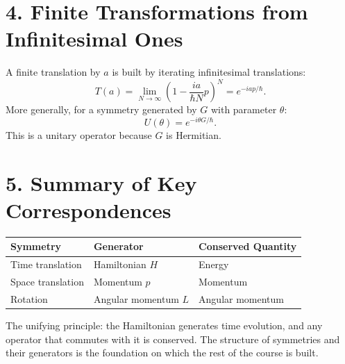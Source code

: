 \documentclass[12pt,a4paper]{article}
\begin{document}
\section{4. Finite Transformations from Infinitesimal Ones}

A finite translation by $a$ is built by iterating infinitesimal translations:
\[
    T(a) = \lim_{N\to\infty}\left(1 - \frac{ia}{\hbar N}p\right)^N = e^{-iap/\hbar}.
\]
More generally, for a symmetry generated by $G$ with parameter $\theta$:
\[
    U(\theta) = e^{-i\theta G/\hbar}.
\]
This is a unitary operator because $G$ is Hermitian.

\section{5. Summary of Key Correspondences}

\begin{center}
\begin{tabular}{l l l}
\textbf{Symmetry} & \textbf{Generator} & \textbf{Conserved Quantity} \\
\hline
Time translation & Hamiltonian $H$ & Energy \\
Space translation & Momentum $p$ & Momentum \\
Rotation & Angular momentum $L$ & Angular momentum \\
\end{tabular}
\end{center}

\medskip
\noindent The unifying principle: the Hamiltonian generates time evolution, and any operator that commutes with it is conserved.  The structure of symmetries and their generators is the foundation on which the rest of the course is built.
\end{document}
